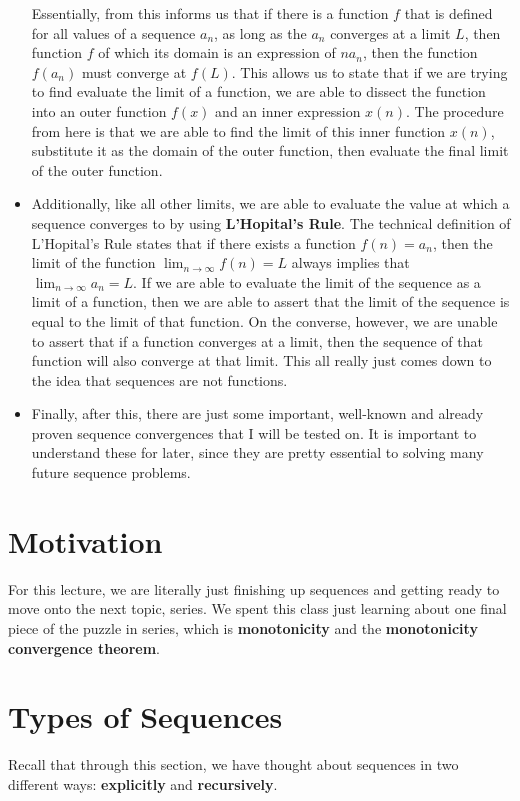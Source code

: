 \documentclass{report}
\begin{document}
\begin{sloppypar}
\begin{itemize}
        Essentially, from this informs us that if there is a function $ f $ that is defined for all values of a sequence $ a_{n}$,
        as long as the $ a_{n} $ converges at a limit $ L $, then function $ f $ of which its domain is an expression of $ n $$
        a_{n} $, then the function $ f(a_{n}) $ must converge at $ f(L) $. This allows us to state that if we are trying to
        find evaluate the limit of a function, we are able to dissect the function into an outer function $ f(x) $ and an
        inner expression $ x(n) $. The procedure from here is that we are able to find the limit of this inner function $ x(n) $,
        substitute it as the domain of the outer function, then evaluate the final limit of the outer function.
  \item Additionally, like all other limits, we are able to evaluate the value at which a sequence converges to
        by using \textbf{L'Hopital's Rule}. The technical definition of L'Hopital's Rule states that if there exists a function
        $ f(n) = a_{n}$, then the limit of the function $ \lim_{n \rightarrow \infty} f(n) = L $ always implies that
        $ \lim_{n \rightarrow \infty} a_{n} = L $. If we are able to evaluate the limit of the sequence as a limit of a function,
        then we are able to assert that the limit of the sequence is equal to the limit of that function. On the converse,
        however, we are unable to assert that if a function converges at a limit, then the sequence of that function will
        also converge at that limit. This all really just comes down to the idea that sequences are not functions.
  \item Finally, after this, there are just some important, well-known and already proven sequence convergences that
        I will be tested on. It is important to understand these for later, since they are pretty essential to solving
        many future sequence problems.


\end{itemize}

\section{Motivation}
For this lecture, we are literally just finishing up sequences and getting ready to move onto the next topic, series. We spent
this class just learning about one final piece of the puzzle in series, which is \textbf{monotonicity} and the
\textbf{monotonicity convergence theorem}.
\section{Types of Sequences}
Recall that through this section, we have thought about sequences in two different ways: \textbf{explicitly} and
\textbf{recursively}.

\end{sloppypar}
\end{document}
